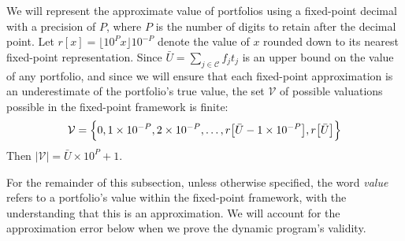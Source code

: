 \documentclass[12pt]{article} %
\theoremstyle{definition}
\theoremstyle{definition}
\begin{document}
We will represent the approximate value of portfolios using a fixed-point decimal with a precision of $P$, where $P$ is the number of digits to retain after the decimal point. Let $r[x] = \lfloor 10^P x \rfloor 10^{-P}$ denote the value of $x$ rounded down to its nearest fixed-point representation. Since $\bar U = \sum_{j\in \mathcal{C}} f_j t_j$ is an upper bound on the value of any portfolio, and since we will ensure that each fixed-point approximation is an underestimate of the portfolio's true value, the set $\mathcal{V}$ of possible valuations possible in the fixed-point framework is finite:
\begin{equation}
\mathcal{V} = \Bigl\{0, 1\times 10^{-P}, 2\times 10^{-P}, \dots, r\bigl[\bar U- 1\times 10^{-P}\bigr], r\bigl[\bar U\bigr]\Bigr\}
\end{equation}
Then $|\mathcal{V} | = \bar U \times 10^P + 1$.

For the remainder of this subsection, unless otherwise specified, the word \emph{value} refers to a portfolio’s value within the fixed-point framework, with the understanding that this is an approximation. We will account for the approximation error below when we prove the dynamic program’s validity. 
\end{document}
